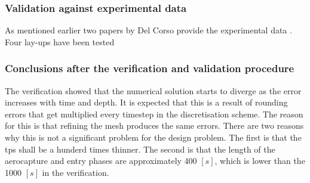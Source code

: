 \subsubsection{Validation against experimental data}
As mentioned earlier two papers by Del Corso provide the experimental data \cite{Corso2009,Corso2011}. Four lay-ups have been tested


\subsubsection{Conclusions after the verification and validation procedure}
The verification showed that the numerical solution starts to diverge as the error increases with time and depth. It is expected that this is a result of rounding errors that get multiplied every timestep in the discretisation scheme. The reason for this is that refining the mesh produces the same errors. There are two reasons why this is not a significant problem for the design problem. The first is that the \gls{tps} shall be a hunderd times thinner. The second is that the length of the aerocapture and entry phases are approximately 400 $\left[s\right]$, which is lower than the 1000 $\left[s\right]$ in the verification. 
 
